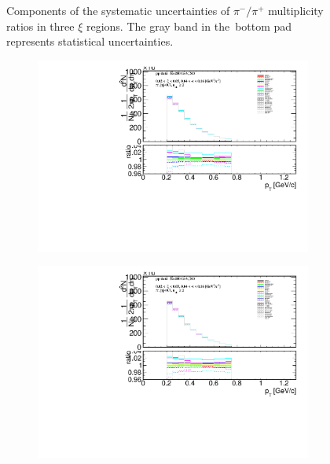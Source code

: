 \begin{figure}[h!]
\begin{subfigure}{.49\textwidth}
	\end{subfigure}
	\begin{minipage}{.49\textwidth}
		\caption{Components of the systematic uncertainties of $\pi^-/\pi^+$ multiplicity ratios  in three $\xi$ regions. The gray band in the~bottom pad represents statistical uncertainties.}
		\label{fig:results_star_syst_pi}
	\end{minipage}
\end{figure}


\begin{figure}[h!]
	\centering
		\begin{subfigure}{.49\textwidth}
			\includegraphics[width=\textwidth,page=22]{chapters/chrgSTAR/img/syst/outPID_SDT.pdf}
		\end{subfigure}
		\begin{subfigure}{.49\textwidth}
			\includegraphics[width=\textwidth,page=23]{chapters/chrgSTAR/img/syst/outPID_SDT.pdf}

\end{subfigure}
\end{figure}
